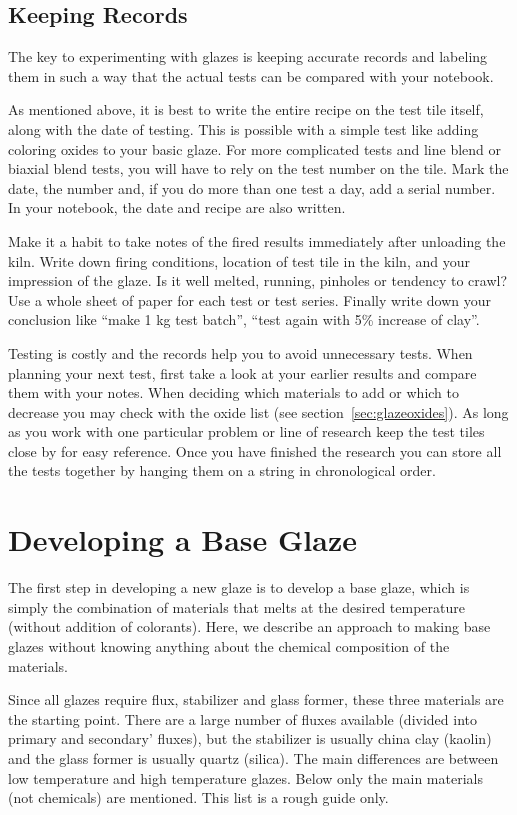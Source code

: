 \subsection{Keeping Records}
The key to experimenting with glazes is keeping accurate records and labeling 
them in such a way that the actual tests can be compared with your notebook.

As mentioned above, it is best to write the entire recipe on the test tile 
itself, along with the date of testing. This is possible with a simple test 
like adding coloring oxides to your basic glaze. For more complicated tests and 
line blend or biaxial blend tests, you will have to rely on the test number on 
the tile. Mark the date, the number and, if you do more than one test a day, 
add a serial number. In your notebook, the date and recipe are also written.

Make it a habit to take notes of the fired results immediately after unloading 
the kiln. Write down firing conditions, location of test tile in the kiln, and 
your impression of the glaze. Is it well melted, running, pinholes or tendency 
to crawl? Use a whole sheet of paper for each test or test series. Finally 
write down your conclusion like ``make 1 kg test batch'', ``test again with 5\% 
increase of clay''.

Testing is costly and the records help you to avoid unnecessary tests. When 
planning your next test, first take a look at your earlier results and compare 
them with your notes. When deciding which materials to add or which to decrease 
you may check with the oxide list (see section~\ref{sec:glazeoxides}). As long 
as you work with one particular problem or line of research keep the test tiles 
close by for easy reference. Once you have finished the research you can store 
all the tests together by hanging them on a string in chronological order.
\section{Developing a Base Glaze}
The first step in developing a new glaze is to develop a base glaze, which is 
simply the combination of materials that melts at the desired temperature 
(without addition of colorants). Here, we describe an approach to making base 
glazes without knowing anything about the chemical composition of the materials.

Since all glazes require flux, stabilizer and glass former, these three 
materials are the starting point. There are a large number of fluxes available 
(divided into primary and secondary' fluxes), but the stabilizer is usually 
china clay (kaolin) and the glass former is usually quartz (silica). The main 
differences are between low temperature and high temperature glazes. Below only 
the main materials (not chemicals) are mentioned. This list is a rough guide 
only.

